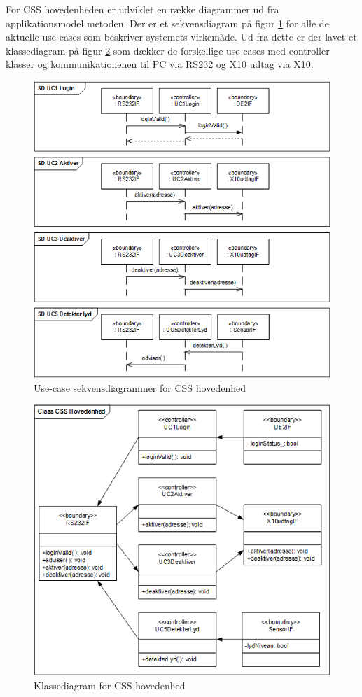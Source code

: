 For CSS hovedenheden er udviklet en række diagrammer ud fra applikationsmodel metoden.
Der er et sekvensdiagram på figur \ref{fig:CSS_hovedenhed_SD} for alle de aktuelle use-cases som beskriver systemets virkemåde.
Ud fra dette er der lavet et klassediagram på figur \ref{fig:CSS_hovedenhed_Class} som dækker de forskellige use-cases med controller klasser og kommunikationenen til PC via RS232 og X10 udtag via X10.


\begin{figure}[!htb]
	\includegraphics{billeder/uml/CSS_hovedenhed_SD}
     \caption{Use-case sekvensdiagrammer for CSS hovedenhed}
     \label{fig:CSS_hovedenhed_SD}
\end{figure}

\begin{figure}[!htb]
     \includegraphics{billeder/uml/CSS_hovedenhed_Class}
     \caption{Klassediagram for CSS hovedenhed}
     \label{fig:CSS_hovedenhed_Class}
\end{figure}
